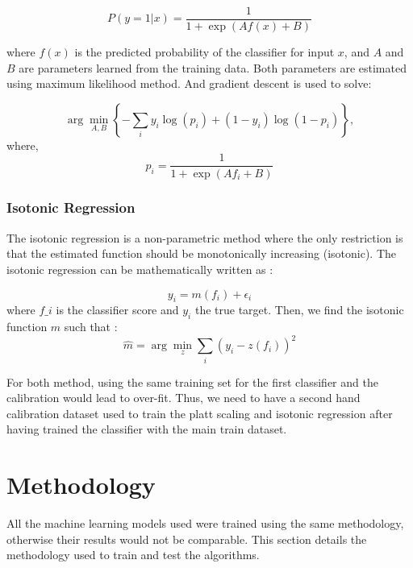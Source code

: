 \documentclass[12pt]{article}
\begin{document}
\begin{equation}
P(y=1|x) = \frac{1}{1 + \exp(Af(x) + B)}    
\end{equation}

where \( f(x) \) is the predicted probability of the classifier for input \( x \), and \( A \) and \( B \) are parameters learned from the training data. Both parameters are estimated using maximum likelihood method. And gradient descent is used to solve:

\begin{equation}
\arg\min_{A,B} \left\{ -\sum_{i} y_i \log(p_i) + (1 - y_i) \log(1 - p_i) \right\},
\end{equation}
where,
\begin{equation}
p_i = \frac{1}{1 + \exp(Af_i + B)}
\end{equation}




\subsubsection{Isotonic Regression}

The isotonic regression is a non-parametric method where the only restriction is that the estimated function should be monotonically increasing (isotonic).
The isotonic regression can be mathematically written as :

\begin{equation}
y_i = m(f_i) + \epsilon_i
\end{equation}
 where $f\_i$ is the classifier score and $y_i$ the true target.
 Then, we find the isotonic function $\hat{m}$ such that :
\begin{equation}
\hat{m} = \arg\min_{z} \sum_{i} \left( y_i - z(f_i) \right)^2
\end{equation}


For both method, using the same training set for the first classifier and the calibration would lead to over-fit. Thus, we need to have a second hand calibration dataset used to train the platt scaling and isotonic regression after having trained the classifier with the main train dataset. 

\newpage
\section{Methodology}
All the machine learning models used were trained using the same methodology, otherwise their results would not be comparable.
This section details the methodology used to train and test the algorithms.
\end{document}
